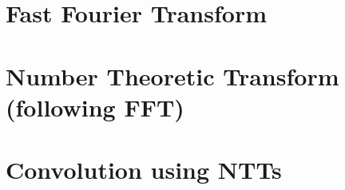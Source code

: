 \documentclass{article}
\begin{document}
\section{Fast Fourier Transform}
 
 
 

\section{Number Theoretic Transform (following FFT)}

\section{Convolution using NTTs}
 
\end{document}
